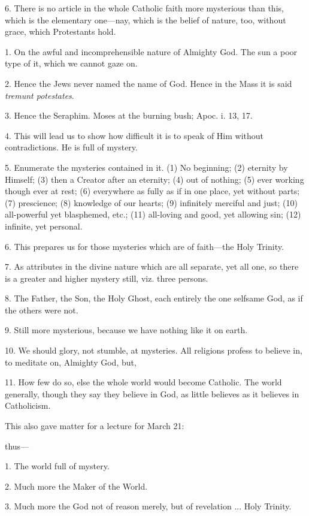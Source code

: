 6. There is no article in the whole Catholic
faith more mysterious than this, which is the elementary one—nay,
which is the belief of nature, too, without grace, which Protestants
hold.


1. On the awful and incomprehensible nature of
Almighty God. The sun a poor type of it, which we cannot gaze on.

2. Hence the Jews never named the name of God.
Hence in the Mass it is said \emph{tremunt potestates}.

3. Hence the Seraphim. Moses at the burning bush;
Apoc. i. 13, 17.

4. This will lead us to show how difficult it is
to speak of Him without contradictions. He is full of mystery.

5. Enumerate the mysteries contained in it. (1)
No beginning; (2) eternity by Himself; (3) then a Creator after an
eternity; (4) out of nothing; (5) ever working though ever at rest;
(6) everywhere as fully as if in one place, yet without parts; (7)
prescience; (8) knowledge of our hearts; (9) infinitely merciful and
just; (10) all-powerful yet blasphemed, etc.; (11) all-loving and
good, yet allowing sin; (12) infinite, yet personal.

6. This prepares us for those mysteries which are
of faith—the Holy Trinity.

7. As attributes in the divine nature which are
all separate, yet all one, so there is a greater and higher mystery
still, viz. three persons.

8. The Father, the Son, the Holy Ghost, each
entirely the one selfsame God, as if the others were not.

9. Still more mysterious, because we have nothing
like it on earth.

10. We should glory, not stumble, at mysteries.
All religions profess to believe in, to meditate on, Almighty God,
but,

11. How few do so, else the whole world would
become Catholic. The world generally, though they say they believe in
God, as little believes as it believes in Catholicism.

This also gave matter for a lecture for March 21:

thus—

1. The world full of mystery.

2. Much more the Maker of the World.

3. Much more the God not of reason merely, but of
revelation ... Holy Trinity.

